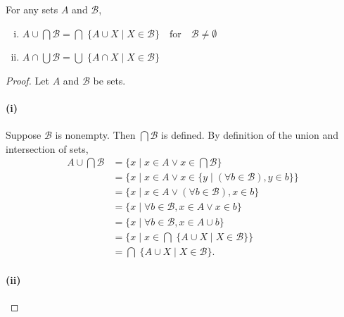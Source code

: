 \documentclass{report}
\begin{document}
  For any sets $A$ and $\mathscr{B}$,
    \begin{enumerate}[(i)]
      \item $A \cup \bigcap \mathscr{B} =
        \bigcap\; \{ A \cup X \mid X \in \mathscr{B} \}
          \quad\text{for}\quad \mathscr{B} \neq \emptyset$
      \item $A \cap \bigcup \mathscr{B} =
        \bigcup\; \{ A \cap X \mid X \in \mathscr{B} \}$
    \end{enumerate}

  \begin{proof}

    Let $A$ and $\mathscr{B}$ be sets.

    \paragraph{(i)}%

      Suppose $\mathscr{B}$ is nonempty.
      Then $\bigcap \mathscr{B}$ is defined.
      By definition of the union and intersection of sets,
        \begin{align*}
          A \cup \bigcap \mathscr{B}
            & = \{ x \mid x \in A \lor x \in \bigcap \mathscr{B} \} \\
            & = \{ x \mid x \in A \lor
              x \in \{ y \mid (\forall b \in \mathscr{B}), y \in b \}\} \\
            & = \{ x \mid x \in A \lor (\forall b \in \mathscr{B}), x \in b \} \\
            & = \{ x \mid \forall b \in \mathscr{B}, x \in A \lor x \in b \} \\
            & = \{ x \mid \forall b \in \mathscr{B}, x \in A \cup b \} \\
            & = \{ x \mid
              x \in \bigcap\; \{ A \cup X \mid X \in \mathscr{B} \}\} \\
            & = \bigcap\; \{ A \cup X \mid X \in \mathscr{B} \}.
        \end{align*}

    \paragraph{(ii)}%


\end{proof}
\end{document}
